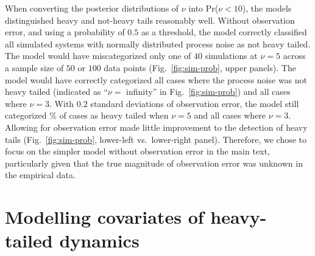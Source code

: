 When converting the posterior distributions of $\nu$ into Pr($\nu < 10$), the
models distinguished heavy and not-heavy tails reasonably well. Without
observation error, and using a probability of $0.5$ as a threshold, the model
correctly classified all simulated systems with normally distributed process
noise as not heavy tailed. The model would have miscategorized only one of $40$
simulations at $\nu = 5$ across a sample size of $50$ or $100$ data points
(Fig.~\ref{fig:sim-prob}, upper panels). The model would have correctly
categorized all cases where the process noise was not heavy tailed (indicated
as ``$\nu =$ infinity'' in Fig.~\ref{fig:sim-prob}) and all cases where $\nu
= 3$. With $0.2$ standard deviations of observation error, the model still
categorized \obsErrorNuFivePerc\% of cases as heavy tailed when $\nu = 5$ and
all cases where $\nu = 3$. Allowing for observation error made little
improvement to the detection of heavy tails (Fig.~\ref{fig:sim-prob},
lower-left vs.\ lower-right panel). Therefore, we chose to focus on the simpler
model without observation error in the main text, particularly given that the
true magnitude of observation error was unknown in the empirical data.

\section{Modelling covariates of heavy-tailed dynamics}

